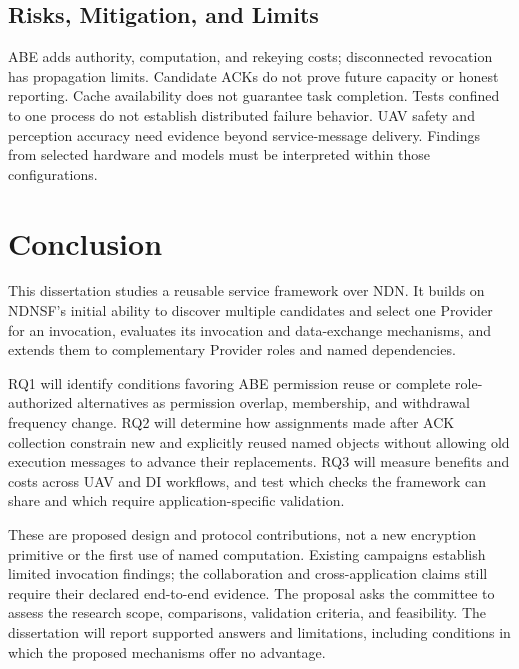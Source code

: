\section{Risks, Mitigation, and Limits}
ABE adds authority, computation, and rekeying costs; disconnected revocation has propagation limits. Candidate ACKs do not prove future capacity or honest reporting. Cache availability does not guarantee task completion. Tests confined to one process do not establish distributed failure behavior. UAV safety and perception accuracy need evidence beyond service-message delivery. Findings from selected hardware and models must be interpreted within those configurations.



\chapter{Conclusion}
\label{chap:conclusion}
This dissertation studies a reusable service framework over NDN. It builds on NDNSF's initial ability to discover multiple candidates and select one Provider for an invocation, evaluates its invocation and data-exchange mechanisms, and extends them to complementary Provider roles and named dependencies.

RQ1 will identify conditions favoring ABE permission reuse or complete role-authorized alternatives as permission overlap, membership, and withdrawal frequency change. RQ2 will determine how assignments made after ACK collection constrain new and explicitly reused named objects without allowing old execution messages to advance their replacements. RQ3 will measure benefits and costs across UAV and DI workflows, and test which checks the framework can share and which require application-specific validation.

These are proposed design and protocol contributions, not a new encryption primitive or the first use of named computation. Existing campaigns establish limited invocation findings; the collaboration and cross-application claims still require their declared end-to-end evidence. The proposal asks the committee to assess the research scope, comparisons, validation criteria, and feasibility. The dissertation will report supported answers and limitations, including conditions in which the proposed mechanisms offer no advantage.
